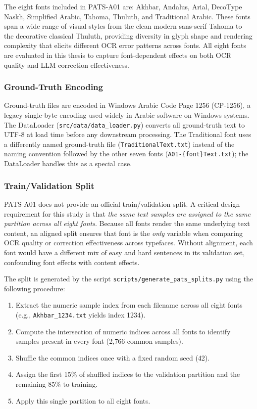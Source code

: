 The eight fonts included in PATS-A01 are:
Akhbar, Andalus, Arial, DecoType Naskh, Simplified Arabic, Tahoma, Thuluth,
and Traditional Arabic.
These fonts span a wide range of visual styles from the clean modern sans-serif
Tahoma to the decorative classical Thuluth, providing diversity in glyph shape
and rendering complexity that elicits different OCR error patterns across fonts.
All eight fonts are evaluated in this thesis to capture font-dependent effects
on both OCR quality and LLM correction effectiveness.

\subsubsection{Ground-Truth Encoding}

Ground-truth files are encoded in Windows Arabic Code Page 1256 (CP-1256), a
legacy single-byte encoding used widely in Arabic software on Windows systems.
The DataLoader (\texttt{src/data/data\_loader.py}) converts all ground-truth text
to UTF-8 at load time before any downstream processing.
The Traditional font uses a differently named ground-truth file
(\texttt{TraditionalText.txt}) instead of the naming convention followed by the
other seven fonts (\texttt{A01-\{font\}Text.txt}); the DataLoader handles this
as a special case.

\subsubsection{Train/Validation Split}
\label{subsubsec:pats_split}

PATS-A01 does not provide an official train/validation split.
A critical design requirement for this study is that \emph{the same text
samples are assigned to the same partition across all eight fonts}. Because
all fonts render the same underlying text content, an aligned split ensures
that font is the \emph{only} variable when comparing OCR quality or
correction effectiveness across typefaces. Without alignment, each font
would have a different mix of easy and hard sentences in its validation set,
confounding font effects with content effects.

The split is generated by the script
\texttt{scripts/generate\_pats\_splits.py} using the following procedure:
\begin{enumerate}
  \item Extract the numeric sample index from each filename across all eight
        fonts (e.g., \texttt{Akhbar\_1234.txt} yields index 1234).
  \item Compute the intersection of numeric indices across all fonts to
        identify samples present in every font (2,766 common samples).
  \item Shuffle the common indices once with a fixed random seed (42).
  \item Assign the first 15\% of shuffled indices to the validation partition
        and the remaining 85\% to training.
  \item Apply this single partition to all eight fonts.
\end{enumerate}

